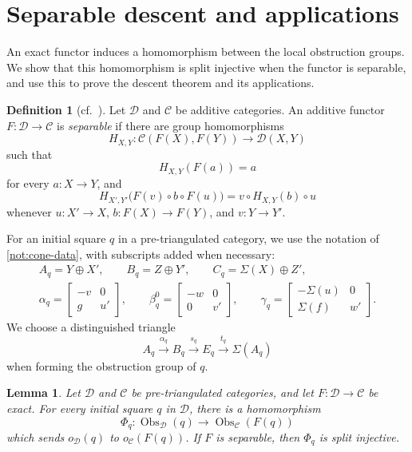 \documentclass[a4paper,11pt,reqno]{amsart}
\newtheorem{lemma}[lemma]{Lemma}
\theoremstyle{definition}
\newtheorem{definition}[definition]{Definition}
\theoremstyle{plain}
\numberwithin{equation}{section}
\newcommand{\C}{\mathcal C}
\newcommand{\D}{\mathcal D}
\begin{document}
\section{Separable descent and applications}
\label{sec:transfer}

An exact functor induces a homomorphism between the local obstruction
groups.  We show that this homomorphism is split injective when the functor
is separable, and use this to prove the descent theorem and its applications.

\begin{definition}[{\normalfont cf.~\cite[Definition~3.7]{Balmer2011}}]
\label{def:separable}
Let \(\D\) and \(\C\) be additive categories.  An additive functor
\(F:\D\to\C\) is \emph{separable} if there are group homomorphisms
\[
 H_{X,Y}:\C(F(X),F(Y))\longrightarrow\D(X,Y)
\]
such that
\[
 H_{X,Y}(F(a))=a
\]
for every \(a:X\to Y\), and
\begin{equation}
\label{eq:separable-bimodule-identity}
 H_{X',Y'}\bigl(F(v)\circ b\circ F(u)\bigr)
 =v\circ H_{X,Y}(b)\circ u
\end{equation}
whenever \(u:X'\to X\), \(b:F(X)\to F(Y)\), and \(v:Y\to Y'\).
\end{definition}

For an initial square \(q\) in a pre-triangulated category, we use the
notation of \cref{not:cone-data}, with subscripts added when necessary:
\[
\begin{gathered}
 A_q=Y\oplus X',\qquad B_q=Z\oplus Y',\qquad
 C_q=\Sigma(X)\oplus Z',\\
 \alpha_q=
 \begin{bmatrix}-v&0\\ g&u'\end{bmatrix},\qquad
 \beta_q^0=
 \begin{bmatrix}-w&0\\0&v'\end{bmatrix},\qquad
 \gamma_q=
 \begin{bmatrix}-\Sigma(u)&0\\ \Sigma(f)&w'\end{bmatrix}.
\end{gathered}
\]
We choose a distinguished triangle
\[
 A_q\xrightarrow{\alpha_q}B_q\xrightarrow{s_q}E_q
 \xrightarrow{t_q}\Sigma(A_q)
\]
when forming the obstruction group of \(q\).

\begin{lemma}
\label{lem:functorial-local-obstruction}
Let \(\D\) and \(\C\) be pre-triangulated categories, and let
\(F:\D\to\C\) be exact.  For every initial square \(q\) in \(\D\), there
is a homomorphism
\[
 \Phi_q:\operatorname{Obs}_{\D}(q)
 \longrightarrow\operatorname{Obs}_{\C}(F(q))
\]
which sends \(o_{\D}(q)\) to \(o_{\C}(F(q))\).  If \(F\) is separable,
then \(\Phi_q\) is split injective.
\end{lemma}
\end{document}
